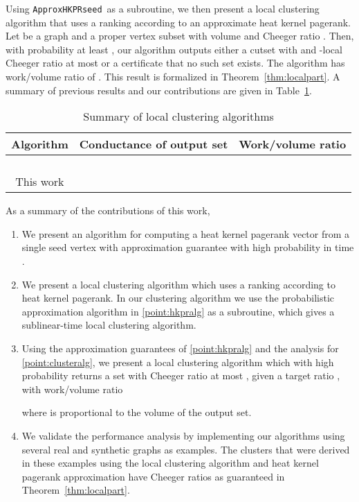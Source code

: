 \documentclass[runningheads,a4paper]{llncs}
\newcommand{\hkprseedalg}{\texttt{ApproxHKPRseed}}
\begin{document}
Using \hkprseedalg~as a subroutine, we then present a local clustering algorithm
that uses a ranking according to an approximate heat kernel pagerank.  Let 
be a graph and  a proper vertex subset with volume 
and Cheeger ratio .  Then, with probability at least
, our algorithm outputs either a cutset  with  and -local Cheeger ratio at most  or a
certificate that no such set exists.  The algorithm has work/volume ratio of
.  This result is formalized in
Theorem~\ref{thm:localpart}.  A summary of previous results and our
contributions are given in Table~\ref{table:resultssummary}.

\begin{table}
\centering
\begin{tabular}{c|c|c}\hline
Algorithm & Conductance of output set & Work/volume ratio\\\hline
\cite{st:localcluster:08} &  & \\
\cite{acl:prgraphpartition:focs06} &  & \\
\cite{ap:evolving:09} &  & \\
\cite{gt:optimalcluster:12} &  & \\
This work &  & \\\hline
\end{tabular}
\caption{Summary of local clustering algorithms}
\label{table:resultssummary}
\end{table}

As a summary of the contributions of this work,
\begin{enumerate}[label={(\arabic*)}]
\item We present an algorithm for computing a heat kernel pagerank vector from a
single seed vertex with  approximation guarantee with high
probability in time .\label{point:hkpralg} 
\item We present a local clustering algorithm which uses a ranking according
to heat kernel pagerank.  In our clustering algorithm we use the probabilistic
approximation algorithm in \ref{point:hkpralg} as a subroutine, which gives a
sublinear-time local clustering algorithm.\label{point:clusteralg} 
\item Using the approximation guarantees of \ref{point:hkpralg} and the analysis
for \ref{point:clusteralg}, we present a local clustering algorithm which with
high probability returns a set with Cheeger ratio at most ,
given a target ratio , with work/volume ratio

where  is proportional to the volume of the output set.
\item We validate the performance analysis by implementing our algorithms using
several real and synthetic graphs as examples.  The clusters that were derived
in these examples using the local clustering algorithm and heat kernel pagerank
approximation have Cheeger ratios as guaranteed in Theorem~\ref{thm:localpart}.
\end{enumerate}
\end{document}
